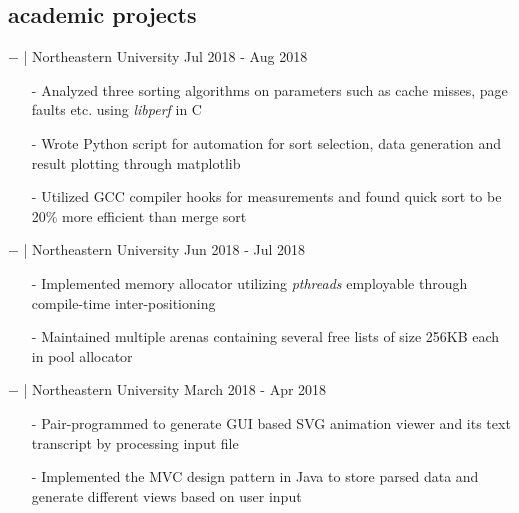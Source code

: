 \documentclass[a4paper, 10pt, oneside]{article}
\newcommand{\bulltetspace}{\vspace{-0.3em}}
\begin{document}

\vspace{-0.5em}
\begin{center}
\section{\color{headings}academic projects}
\vspace{-0.5em}

$-$ \color{headings}{Performance Analysis of Sorting Algorithms } | Northeastern University  \hfill Jul 2018 - Aug 2018\\
\color{text1}
\begin{itemize}
\bulltetspace
\item[-] Analyzed three sorting algorithms on parameters such as cache misses, page faults etc. using \textit{libperf} in C\\
\bulltetspace
\item[-] Wrote Python script for automation for sort selection, data generation and result plotting through matplotlib \\
\bulltetspace
\item[-] Utilized GCC compiler hooks for measurements and found quick sort to be 20\% more efficient than merge sort
\vspace{0.0em}
\end{itemize}

\vspace{-0.5em}
$-$ \color{headings}{Thread safe memory allocator based on pool allocation strategy} | Northeastern University \hfill Jun 2018 - Jul 2018\\
\color{text1}
\begin{itemize}
\bulltetspace
\item[-] Implemented memory allocator utilizing \textit{pthreads} employable through compile-time inter-positioning \\
\bulltetspace
\item[-] Maintained multiple arenas containing several free lists of size 256KB each in pool allocator
\vspace{0.0em}
\end{itemize}

\vspace{-0.5em}
$-$ \color{headings}{Animation generator based on MVC design pattern} | Northeastern University \hfill March 2018 - Apr 2018\\
\color{text1}
\begin{itemize}
\bulltetspace
\item[-] Pair-programmed to generate GUI based SVG animation viewer and its text transcript by processing input file\\
\bulltetspace
\item[-] Implemented the MVC design pattern in Java to store parsed data and generate different views based on user input
\vspace{0.0em}
\end{itemize}



\end{center}
\end{document}
